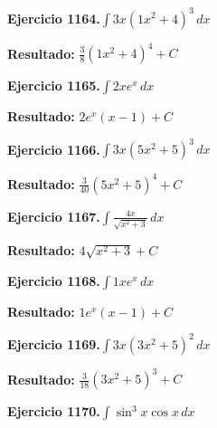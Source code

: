 \documentclass[10pt,a4paper]{article}
\begin{document}
\begin{ejbox}
\textbf{Ejercicio 1164.}\quad $\int 3x(1x^2 + 4)^{3}\,dx$
\end{ejbox}

\begin{solbox}
\textbf{Resultado:} \(\displaystyle \frac{3}{8}(1x^2+4)^{4} + C\)
\end{solbox}

\newpage
\begin{ejbox}
\textbf{Ejercicio 1165.}\quad $\int 2x e^{x}\,dx$
\end{ejbox}

\begin{solbox}
\textbf{Resultado:} \(\displaystyle 2e^x(x-1) + C\)
\end{solbox}

\begin{ejbox}
\textbf{Ejercicio 1166.}\quad $\int 3x(5x^2 + 5)^{3}\,dx$
\end{ejbox}

\begin{solbox}
\textbf{Resultado:} \(\displaystyle \frac{3}{40}(5x^2+5)^{4} + C\)
\end{solbox}

\begin{ejbox}
\textbf{Ejercicio 1167.}\quad $\int \frac{4x}{\sqrt{x^2+3}}\,dx$
\end{ejbox}

\begin{solbox}
\textbf{Resultado:} \(\displaystyle 4\sqrt{x^2+3} + C\)
\end{solbox}

\newpage
\begin{ejbox}
\textbf{Ejercicio 1168.}\quad $\int 1x e^{x}\,dx$
\end{ejbox}

\begin{solbox}
\textbf{Resultado:} \(\displaystyle 1e^x(x-1) + C\)
\end{solbox}

\begin{ejbox}
\textbf{Ejercicio 1169.}\quad $\int 3x(3x^2 + 5)^{2}\,dx$
\end{ejbox}

\begin{solbox}
\textbf{Resultado:} \(\displaystyle \frac{3}{18}(3x^2+5)^{3} + C\)
\end{solbox}

\begin{ejbox}
\textbf{Ejercicio 1170.}\quad $\int \sin^{3}x \cos x\,dx$
\end{ejbox}
\end{document}
